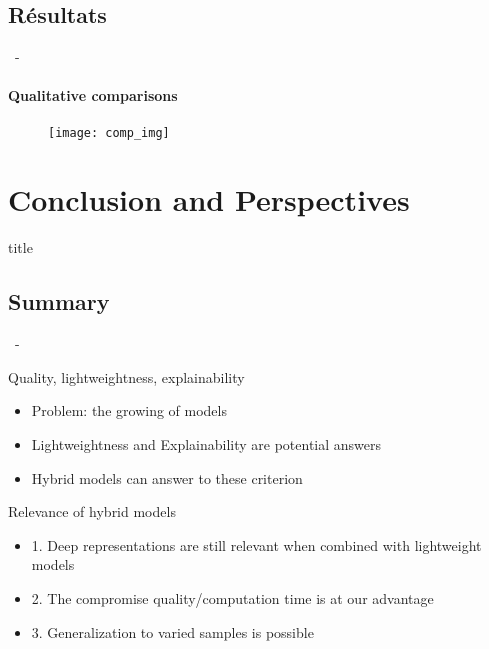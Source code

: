 \documentclass[aspectratio=169, 22pt]{beamer}
\begin{document}
\subsection{Résultats}
\begin{frame}{\secname~- \subsecname}
  \framesubtitle{Qualitative comparisons}
  \begin{figure}
    \texttt{[image: comp\_img]}
  \end{figure}
\end{frame}

\section{Conclusion and Perspectives}
\begin{frame}
  \begin{beamercolorbox}[sep=15pt,center,shadow=true,rounded=true]{title}
    \LARGE\bfseries \secname
  \end{beamercolorbox}
\end{frame}

\subsection{Summary}
\begin{frame}{\secname~- \subsecname}
  \begin{customblock}{Quality, lightweightness, explainability}
    \begin{itemize}
    \item Problem: the growing of models
    \item Lightweightness and Explainability are potential answers
    \item Hybrid models can answer to these criterion
    \end{itemize}
  \end{customblock}

  \pause
  \begin{exampleblock}{Relevance of hybrid models}
    \begin{itemize}  
    \item 1. Deep representations are still relevant when combined with lightweight models
    \item 2. The compromise quality/computation time is at our advantage
    \item 3. Generalization to varied samples is possible
    \end{itemize}
  \end{exampleblock}
\end{frame}
\end{document}
